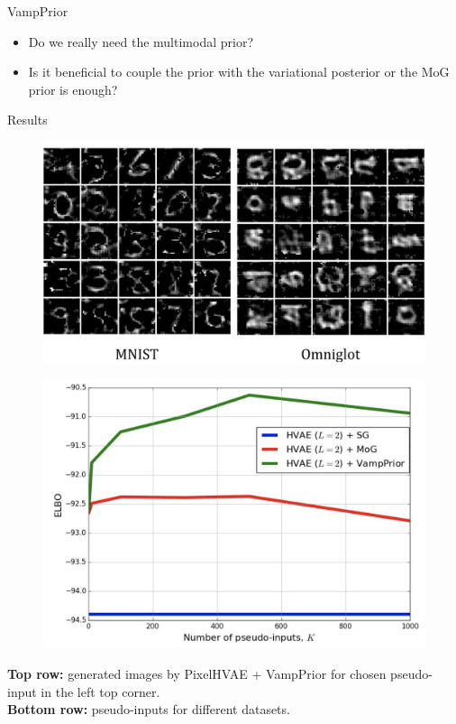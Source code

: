 \begin{frame}{VampPrior}
	\begin{itemize}
	\item Do we really need the multimodal prior?
	\item Is it beneficial to couple the prior with the variational posterior or the MoG prior is enough?
	\end{itemize}
	\begin{block}{Results}
		\vspace{-0.3cm}
		\begin{minipage}[t]{0.55\columnwidth}
			\begin{figure}[h]
				\centering
				\includegraphics[width=1.0\linewidth]{figs/VampPrior_1.png}
			\end{figure}
		\end{minipage}%
		\begin{minipage}[t]{0.45\columnwidth}
			\begin{figure}[h]
				\centering
				\includegraphics[width=1.0\linewidth]{figs/VampPrior_2.png}
			\end{figure}
		\end{minipage}
	\end{block}
	\textbf{Top row:} generated images by PixelHVAE + VampPrior for chosen pseudo-input in the left top corner. \\
	\vspace{0.1cm}
	\textbf{Bottom row:} pseudo-inputs for different datasets.
\end{frame}
